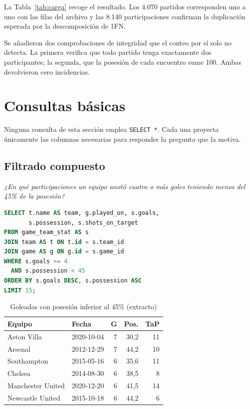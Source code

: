 \documentclass[conference]{IEEEtran}
\begin{document}
La Tabla~\ref{tab:carga} recoge el resultado. Los 4.070 partidos corresponden
uno a uno con las filas del archivo y las 8.140 participaciones confirman la
duplicación esperada por la descomposición de 1FN.

Se añadieron dos comprobaciones de integridad que el conteo por sí solo no
detecta. La primera verifica que todo partido tenga exactamente dos
participantes; la segunda, que la posesión de cada encuentro sume 100. Ambas
devolvieron cero incidencias.

\section{Consultas básicas}

Ninguna consulta de esta sección emplea \texttt{SELECT *}. Cada una proyecta
únicamente las columnas necesarias para responder la pregunta que la motiva.

\subsection{Filtrado compuesto}

\emph{¿En qué participaciones un equipo anotó cuatro o más goles teniendo menos
del 45\% de la posesión?}

\begin{lstlisting}[language=SQL]
SELECT t.name AS team, g.played_on, s.goals,
       s.possession, s.shots_on_target
FROM game_team_stat AS s
JOIN team AS t ON t.id = s.team_id
JOIN game AS g ON g.id = s.game_id
WHERE s.goals >= 4
  AND s.possession < 45
ORDER BY s.goals DESC, s.possession ASC
LIMIT 15;
\end{lstlisting}

\begin{table}[htbp]
\caption{Goleadas con posesión inferior al 45\% (extracto)}
\label{tab:filtrado}
\centering
\begin{tabular}{llrrr}
\toprule
\textbf{Equipo} & \textbf{Fecha} & \textbf{G} & \textbf{Pos.} & \textbf{TaP} \\
\midrule
Aston Villa       & 2020-10-04 & 7 & 30,2 & 11 \\
Arsenal           & 2012-12-29 & 7 & 44,2 & 10 \\
Southampton       & 2015-05-16 & 6 & 35,6 & 11 \\
Chelsea           & 2014-08-30 & 6 & 38,5 & 8  \\
Manchester United & 2020-12-20 & 6 & 41,5 & 14 \\
Newcastle United  & 2015-10-18 & 6 & 44,2 & 6  \\
\bottomrule
\end{tabular}
\end{table}
\end{document}

